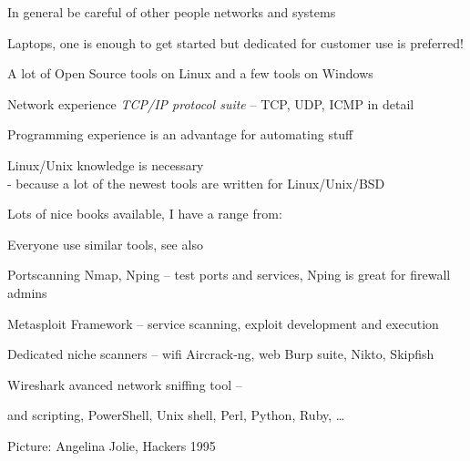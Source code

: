 \documentclass[Screen16to9,17pt]{foils}
\begin{document}
\centerline{In general be careful of other people networks and systems}




\begin{list1}

\item Laptops, one is enough to get started but dedicated for customer use is preferred!
\begin{list2}
\item A lot of Open Source tools on Linux and a few tools on Windows
\item Network experience \emph{TCP/IP protocol suite} -- TCP, UDP, ICMP in detail
\item Programming experience is an advantage for automating stuff
\item Linux/Unix knowledge is necessary \\
- because a lot of the newest tools are written for Linux/Unix/BSD
\item Lots of nice books available, I have a range from:

\end{list2}
\end{list1}



\begin{list2}
\item Everyone use similar tools, see also 
\item Portscanning Nmap, Nping -- test ports and services, Nping is great for firewall admins 
\item Metasploit Framework -- service scanning, exploit development and execution 
\item Dedicated niche scanners -- wifi Aircrack-ng, web Burp suite, Nikto, Skipfish 
\item Wireshark avanced network sniffing tool -- 
\item and scripting, PowerShell, Unix shell, Perl, Python, Ruby, \ldots
\end{list2}

Picture: Angelina Jolie, Hackers 1995

\end{document}
